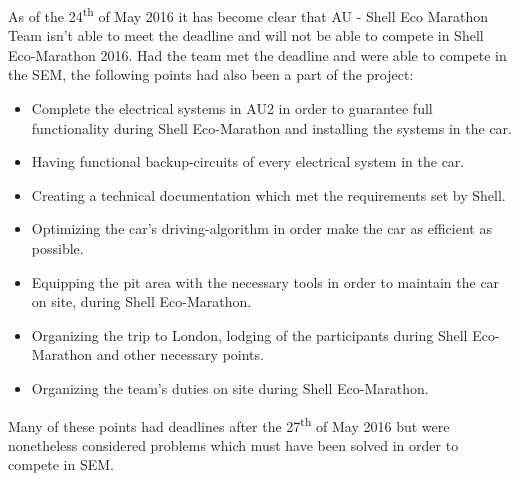 As of the 24\textsuperscript{th} of May 2016 it has become clear that AU - Shell Eco Marathon Team isn't able to meet the deadline and will not be able to compete in Shell Eco-Marathon 2016. Had the team met the deadline and were able to compete in the SEM, the following points had also been a part of the project:
\begin{itemize}
	\item Complete the electrical systems in AU2 in order to guarantee full functionality during Shell Eco-Marathon and installing the systems in the car.
	\item Having functional backup-circuits of every electrical system in the car.
	\item Creating a technical documentation which met the requirements set by Shell.
	\item Optimizing the car's driving-algorithm in order make the car as efficient as possible.
	\item Equipping the pit area with the necessary tools in order to maintain the car on site, during Shell Eco-Marathon.
	\item Organizing the trip to London, lodging of the participants during Shell Eco-Marathon and other necessary points.
	\item Organizing the team's duties on site during Shell Eco-Marathon.
\end{itemize}
Many of these points had deadlines after the 27\textsuperscript{th} of May 2016 but were nonetheless considered problems which must have been solved in order to compete in SEM.